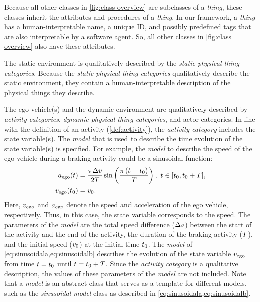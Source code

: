 \cstartb Because all other classes in \cref{fig:class overview} are subclasses of a \textit{thing}, these classes inherit the attributes and procedures of a \textit{thing}. In our framework, a \textit{thing} has a human-interpretable name, a unique ID, and possibly predefined tags that are also interpretable by a software agent. So, all other classes in \cref{fig:class overview} also have these attributes. \cendb

The static environment is qualitatively described by \cstartc the \textit{static physical thing categories}. \cendc
Because the \cstartc\textit{static physical thing categories} \cendc qualitatively describe the static environment, they contain a human-interpretable description of the \cstartc physical things they describe\cendc.

The ego vehicle\cstartd(s) \cendd and the dynamic environment are qualitatively described by \textit{activity categories}, \cstartb\textit{dynamic physical thing categories}\cendb, and actor categories. 
In line with the definition of an activity (\cref{def:activity}), the \textit{activity category} includes the state variable(s).
The \textit{model} that is used to describe the time evolution of the state  variable(s) is specified. For example, the \textit{model} to describe the speed of the ego vehicle during a braking activity could be a sinusoidal function:
\begin{align} 
	\egoacceleration(\time) &= \frac{\pi \amplitude}{2\duration} \sin \left( \frac{\pi \left( \time - \inittime\right)}{\duration} \right),\ \time \in [\inittime, \inittime+\duration], \label{eq:sinusoidala} \\
	\egospeed(\inittime) &= \egospeedinit. \label{eq:sinusoidalb}
\end{align}
Here, $v_{\mathrm{ego}}$ and $a_{\mathrm{ego}}$ denote the speed and acceleration of the ego vehicle, respectively. Thus, in this case, the state variable corresponds to the speed. 
The parameters of the \textit{model} are the total speed difference ($\Delta v$) between the start of the activity and the end of the activity, the duration of the braking activity ($T$), and the initial speed ($v_{0}$) at the initial time $t_{0}$. 
The \textit{model} of \cref{eq:sinusoidala,eq:sinusoidalb} describes the evolution of the state variable $v_{\mathrm{ego}}$ from time $t=t_{0}$ until $t=t_{0}+T$. Since the \textit{activity category} is a qualitative description, the values of these parameters of the \textit{model} are not included.
\cstartb Note that a \textit{model} is an abstract class that serves as a template for different models, such as the \textit{sinusoidal model} class as described in \cref{eq:sinusoidala,eq:sinusoidalb}. \cendb

